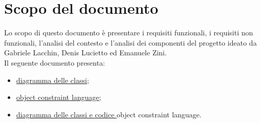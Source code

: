 \section*{Scopo del documento}
Lo scopo di questo documento è presentare i requisiti funzionali, i requisiti non funzionali, l'analisi del contesto e l'analisi dei componenti del progetto \nome ideato da Gabriele Lacchin, Denis Lucietto ed Emanuele Zini.\\
Il seguente documento presenta:
\begin{itemize}
    \item \hyperref[secD3:DiagrammaDelleClassi]{diagramma delle classi};
    \item \hyperref[secD3:ObjectConstraintLanguage]{object constraint language};
    \item \hyperref[secD3:DiagrammaECodiceObjectConstraintLanguage]{diagramma delle classi e codice }object constraint language.
\end{itemize}
